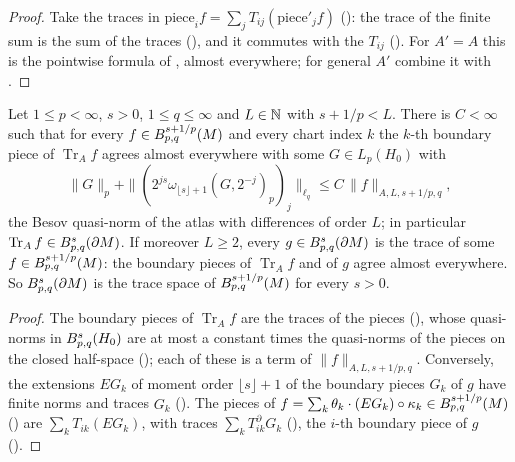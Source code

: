 \begin{proof}
\leanok
Take the traces in $\text{piece}_i f = \sum_j T_{ij}(\text{piece}'_j f)$
(): the trace of the finite sum is the sum of the traces
(), and it commutes with the $T_{ij}$ (). For
$A' = A$ this is the pointwise formula of , almost everywhere; for
general $A'$ combine it with .
\end{proof}

\begin{theorem}
\label{thm:manifold-trace}
\leanok
{}
Let $1 \leq p < \infty$, $s > 0$, $1 \leq q \leq \infty$ and $L \in \mathbb{N}$ with $s + 1/p < L$. There
is $C < \infty$ such that for every $f \in B^{s+1/p}_{p,q}(M)$ and every chart index $k$ the
$k$-th boundary piece of $\operatorname{Tr}_A f$ agrees almost everywhere with some
$G \in L_p(H_0)$ with
\[
  \|G\|_p + \|(2^{js} \omega_{\lfloor s \rfloor + 1}(G, 2^{-j})_p)_j\|_{\ell_q}
  \leq C \, \|f\|_{A, L, s + 1/p, q},
\]
the Besov quasi-norm of the atlas with differences of order $L$; in particular
$\operatorname{Tr}_A f \in B^{s}_{p,q}(\partial M)$. If moreover $L \geq 2$, every
$g \in B^{s}_{p,q}(\partial M)$ is the trace of some $f \in B^{s+1/p}_{p,q}(M)$: the
boundary pieces of $\operatorname{Tr}_A f$ and of $g$ agree almost everywhere. So
$B^{s}_{p,q}(\partial M)$ is the trace space of $B^{s+1/p}_{p,q}(M)$ for every $s > 0$.
\end{theorem}

\begin{proof}
\leanok
The boundary pieces of $\operatorname{Tr}_A f$ are the traces of the pieces
(), whose quasi-norms in $B^{s}_{p,q}(H_0)$ are at most a
constant times the quasi-norms of the pieces on the closed half-space
(); each of these is a term of $\|f\|_{A, L, s + 1/p, q}$.
Conversely, the extensions $E G_k$ of moment order
$\lfloor s \rfloor + 1$ of the boundary pieces $G_k$ of $g$ have finite norms and traces $G_k$
(). The pieces of
$f = \sum_k \theta_k \cdot (E G_k) \circ \kappa_k \in B^{s+1/p}_{p,q}(M)$
() are $\sum_k T_{ik}(E G_k)$, with traces $\sum_k T^\partial_{ik} G_k$
(), the $i$-th boundary piece of $g$
().
\end{proof}

